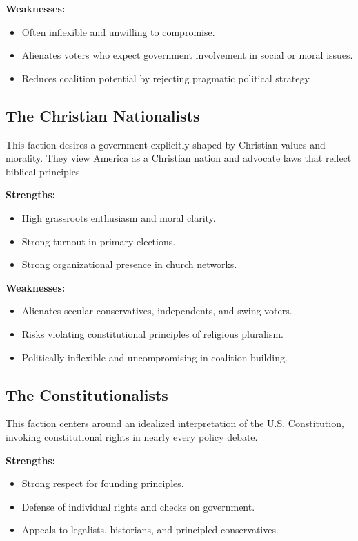 \textbf{Weaknesses:}
\begin{itemize}
\item Often inflexible and unwilling to compromise.
\item Alienates voters who expect government involvement in social or moral issues.
\item Reduces coalition potential by rejecting pragmatic political strategy.
\end{itemize}

\subsection{The Christian Nationalists}
This faction desires a government explicitly shaped by Christian values and morality. They view America as a Christian nation and advocate laws that reflect biblical principles.

\textbf{Strengths:}
\begin{itemize}
\item High grassroots enthusiasm and moral clarity.
\item Strong turnout in primary elections.
\item Strong organizational presence in church networks.
\end{itemize}

\textbf{Weaknesses:}
\begin{itemize}
\item Alienates secular conservatives, independents, and swing voters.
\item Risks violating constitutional principles of religious pluralism.
\item Politically inflexible and uncompromising in coalition-building.
\end{itemize}

\subsection{The Constitutionalists}
This faction centers around an idealized interpretation of the U.S. Constitution, invoking constitutional rights in nearly every policy debate.

\textbf{Strengths:}
\begin{itemize}
\item Strong respect for founding principles.
\item Defense of individual rights and checks on government.
\item Appeals to legalists, historians, and principled conservatives.
\end{itemize}

